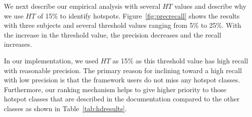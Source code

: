 We next describe our empirical analysis with several $HT$ values and describe
why we use $HT$ of 15\% to identify hotspots. Figure~\ref{fig:precrecall}
shows the results with three subjects and several threshold values ranging from 5\% to 25\%.
With the increase in the threshold value, the precision decreases
and the recall increases. 

In our implementation, we used $HT$ as 15\%
as this threshold value has high recall with reasonable precision.
The primary reason for inclining toward a high recall with low precision
is that the framework users do not miss any hotspot classes. Furthermore,
our ranking mechanism helps to give higher priority to those
hotspot classes that are described in the documentation compared
to the other classes as shown in Table~\ref{tab:hdresults}.
